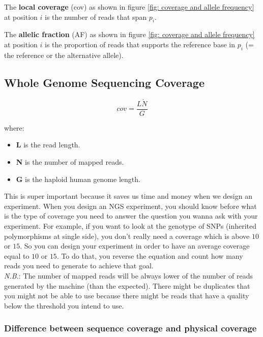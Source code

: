 The \textbf{local coverage} (cov) as shown in figure \ref{fig: coverage and
allele frequency} at position $i$ is the number of reads that span $p_i$.

The \textbf{allelic fraction} (AF) as shown in figure \ref{fig: coverage and
allele frequency} at position $i$ is the proportion of reads that supports the
reference base in $p_i$ (= the reference or the alternative allele).

\subsection{Whole Genome Sequencing Coverage}

\begin{equation} \label{eq: coverage formula}
  cov = \frac{L \dot N}{G}
\end{equation}

where:

\begin{itemize}
\item
  \textbf{L} is the read length.
\item
  \textbf{N} is the number of mapped reads.
\item
  \textbf{G} is the haploid human genome length.
\end{itemize}


This is super important because it saves us time and money when we design an
experiment. When you design an NGS experiment, you should know before what is
the type of coverage you need to answer the question you wanna ask with your
experiment. For example, if you want to look at the genotype of SNPs (inherited
polymorphisms at single side), you don't really need a coverage which is above
$10$ or $15$. So you can design your experiment in order to have an average
coverage equal to $10$ or $15$. To do that, you reverse the equation and count
how many reads you need to generate to achieve that goal. \\

\textit{N.B.}: The number of mapped reads will be always lower of the number of
reads generated by the machine (than the expected). There might be duplicates
that you might not be able to use because there might be reads that have a
quality below the threshold you intend to use.


\hypertarget{difference-between-sequence-coverage-and-physical-coverage}{%
\subsubsection{Difference between sequence coverage and physical
coverage}\label{difference-between-sequence-coverage-and-physical-coverage}}


